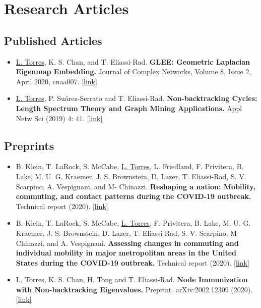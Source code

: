 \documentclass[12pt,]{scrartcl}
\date{}
\newenvironment{myitemize}
{ \begin{itemize}
    \setlength{\itemsep}{5pt}
    \setlength{\parskip}{0pt}
    \setlength{\parsep}{0pt}     }
{ \end{itemize}                  }
\begin{document}
\section{Research Articles}\label{publications}

\subsection{Published Articles}\label{articles}

\begin{myitemize}
\leftskip-0.25in %

\item \underline{L. Torres}, K. S. Chan, and T. Eliassi-Rad. \textbf{GLEE: Geometric Laplacian Eigenmap Embedding.} Journal of Complex Networks, Volume 8, Issue 2, April 2020, cnaa007. \href{https://academic.oup.com/comnet/article/8/2/cnaa007/5775302?guestAccessKey=a6a1e399-bc7d-48db-82ad-5a3beabd81bf}{[link]}

\item \underline{L. Torres}, P. Su\'arez-Serrato and T. Eliassi-Rad.  \textbf{Non-backtracking Cycles: Length Spectrum Theory and Graph Mining Applications.}  Appl Netw Sci (2019) 4: 41. \href{https://doi.org/10.1007/s41109-019-0147-y}{[link]}

\end{myitemize}


\subsection{Preprints}\label{preprints}

\begin{myitemize}
\leftskip-0.25in %

\item B. Klein, T. LaRock, S. McCabe, \underline{L. Torres}, L. Friedland, F. Privitera, B. Lake, M. U. G. Kraemer, J. S. Brownstein, D. Lazer, T. Eliassi-Rad, S. V. Scarpino, A. Vespignani, and M- Chinazzi. \textbf{Reshaping a nation: Mobility, commuting, and contact patterns during the COVID-19 outbreak.} Technical report (2020). \href{https://www.mobs-lab.org/uploads/6/7/8/7/6787877/covid19mobility_report2.pdf}{[link]}

\item B. Klein, T. LaRock, S. McCabe, \underline{L. Torres}, F. Privitera, B. Lake, M. U. G. Kraemer, J. S. Brownstein, D. Lazer, T. Eliassi-Rad, S. V. Scarpino, M- Chinazzi, and A. Vespignani. \textbf{Assessing changes in commuting and individual mobility in major metropolitan areas in the United States during the COVID-19 outbreak.} Technical report (2020). \href{https://www.mobs-lab.org/uploads/6/7/8/7/6787877/assessing_mobility_changes_in_the_united_states_during_the_covid_19_outbreak.pdf}{[link]}

\item \underline{L. Torres}, K. S. Chan, H. Tong and T. Eliassi-Rad. \textbf{Node Immunization with Non-backtracking Eigenvalues.} Preprint. arXiv:2002.12309 (2020). \href{https://arxiv.org/abs/2002.12309}{[link]}

\end{myitemize}
\end{document}
